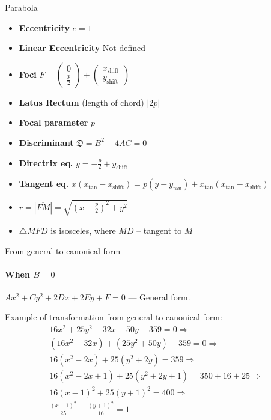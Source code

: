 \documentclass[aspectratio=169]{beamer}
\newcommand{\shf}{\text{shift}}
\begin{document}
\begin{frame}[t]{Parabola}
\begin{multicols}{3}
\begin{itemize}
        \item \textbf{Eccentricity} $e = 1$
        \item \textbf{Linear Eccentricity} Not defined
        \item \textbf{Foci} $F = \begin{pmatrix} 0\\\frac{p}{2} \end{pmatrix} + \begin{pmatrix} x_{\shf}\\y_{\shf} \end{pmatrix}$
        \item \textbf{Latus Rectum} (length of chord) $|2p|$
        \item \textbf{Focal parameter}  $p$
        \item \textbf{Discriminant} $\mathfrak{D} = B^2 - 4AC = 0$
        \item \textbf{Directrix eq.} $y = -\frac{p}{2} + y_{\shf}$
        \item \textbf{Tangent eq.}  $x(x_{\text{tan}}-x_{\shf})=p(y-y_{\text{tan}})+x_{\text{tan}}(x_{\text{tan}}-x_{\shf})$
        \item $r = |\overline{FM}|=\sqrt{(x-\frac{p}{2})^2+y^2}$
        \item $\triangle MFD$ is isosceles, where $MD$ -- tangent to $M$
        \end{itemize}
\end{multicols}
\end{frame}

\begin{frame}[t]{From general to canonical form}
\framesubtitle{When $B=0$}
    $Ax^2 +Cy^2 +2Dx + 2Ey +F = 0$ --- General form. \medskip

    Example of transformation from general to canonical form:
    \begin{align*}
        16x^2 + 25y^2 - 32x + 50y -359 = 0 \Rightarrow \\
        (16x^2 - 32x) + (25y^2 +50y) -359 = 0 \Rightarrow \\ 
        16(x^2 - 2x) + 25(y^2 + 2y) = 359 \Rightarrow \\ 
        16(x^2 -2x +1) + 25(y^2 +2y +1) = 350 + 16 + 25 \Rightarrow \\
        16(x-1)^2 +25(y+1)^2 = 400 \Rightarrow \\ 
        \frac{(x-1)^2}{25}+\frac{(y+1)^2}{16}=1
    \end{align*}
\end{frame}
\end{document}
